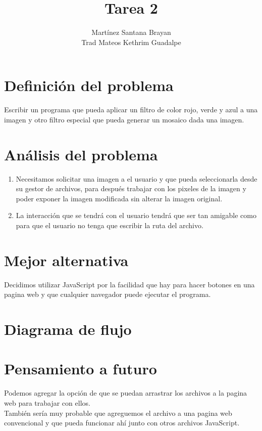 \documentclass{article}
\title{Tarea 2}
\author{Martínez Santana Brayan\\
Trad Mateos Kethrim Guadalpe
}
\begin{document}
\maketitle
\section{Definición del problema}
Escribir un programa que pueda aplicar un filtro de color rojo, verde y azul a una imagen y otro filtro especial que pueda generar un mosaico dada una imagen.

\section{Análisis del problema}
\begin{enumerate}
    \item Necesitamos solicitar una imagen a el usuario y que pueda seleccionarla desde su gestor de archivos, para después trabajar con los pixeles de la imagen y poder exponer la imagen modificada sin alterar la imagen original.
    \item La interacción que se tendrá con el usuario tendrá que ser tan amigable como para que el usuario no tenga que escribir la ruta del archivo.
\end{enumerate}
\section{Mejor alternativa} Decidimos utilizar JavaScript por la facilidad que hay para hacer botones en una pagina web y que cualquier navegador puede ejecutar el programa.

\section{Diagrama de flujo}


\section{Pensamiento a futuro}
Podemos agregar la opción de que se puedan arrastrar los archivos a la pagina web para trabajar con ellos.\\
También sería muy probable que agreguemos el archivo a una pagina web convencional y que pueda funcionar ahí junto con otros archivos JavaScript.
\end{document}
